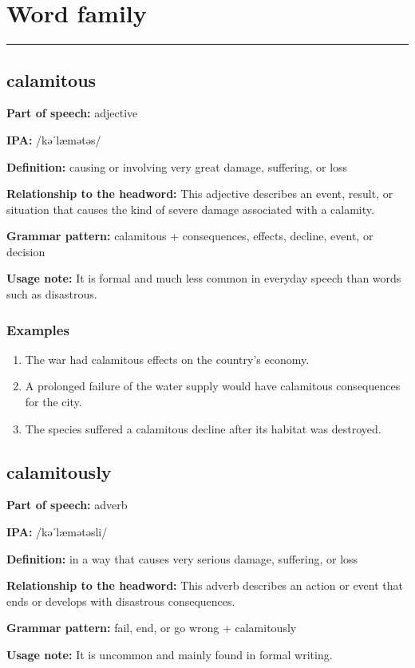 \documentclass[11pt]{article}
\newcommand{\sectionrule}{\par\vspace{-0.5em}\noindent\textcolor{Accent}{\rule{\linewidth}{0.6pt}}\par}
\begin{document}
\section{Word family}
\sectionrule
\subsection{calamitous}
\textbf{Part of speech:} adjective

\textbf{IPA:} /kəˈlæmətəs/

\textbf{Definition:} causing or involving very great damage, suffering, or loss

\textbf{Relationship to the headword:} This adjective describes an event, result, or situation that causes the kind of severe damage associated with a calamity.

\textbf{Grammar pattern:} calamitous + consequences, effects, decline, event, or decision

\textbf{Usage note:} It is formal and much less common in everyday speech than words such as disastrous.

\subsubsection{Examples}
\begin{enumerate}
  \item The war had calamitous effects on the country's economy.
  \item A prolonged failure of the water supply would have calamitous consequences for the city.
  \item The species suffered a calamitous decline after its habitat was destroyed.
\end{enumerate}

\subsection{calamitously}
\textbf{Part of speech:} adverb

\textbf{IPA:} /kəˈlæmətəsli/

\textbf{Definition:} in a way that causes very serious damage, suffering, or loss

\textbf{Relationship to the headword:} This adverb describes an action or event that ends or develops with disastrous consequences.

\textbf{Grammar pattern:} fail, end, or go wrong + calamitously

\textbf{Usage note:} It is uncommon and mainly found in formal writing.
\end{document}
